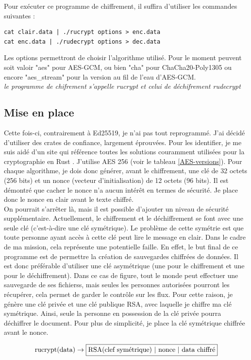 \documentclass[a4paper, 12pt]{article}
\begin{document}
Pour exécuter ce programme de chiffrement, il suffira d'utiliser les commandes suivantes : 
\begin{verbatim}
cat clair.data | ./rucrypt options > enc.data
cat enc.data | ./rudecrypt options > dec.data
\end{verbatim}
Les options permettront de choisir l'algorithme utilisé. Pour le moment peuvent soit valoir "aes" pour AES-GCM, ou bien "cha" pour ChaCha20-Poly1305 ou encore "aes\_stream" pour la version au fil de l'eau d'AES-GCM.\\


\noindent\emph{le programme de chifrement s'appelle rucrypt et celui de déchifrement rudecrypt}

\subsection{Mise en place}
Cette fois-ci, contrairement à Ed25519, je n'ai pas tout reprogrammé. J'ai décidé d'utiliser des crates de confiance, largement éprouvées. Pour les identifier, je me suis aidé d'un site qui référence toutes les solutions couramment utilisées pour la cryptographie en Rust \cite{bddrustcrypto}. J'utilise AES 256 (voir le tableau \ref{AES-versions}). Pour chaque algorithme, je dois donc générer, avant le chiffrement, une clé de 32 octets (256 bits) et un nonce (vecteur d'initialisation) de 12 octets (96 bits). Il est démontré que cacher le nonce n'a aucun intérêt en termes de sécurité. Je place donc le nonce en clair avant le texte chiffré. \\

On pourrait s'arrêter là, mais il est possible d'ajouter un niveau de sécurité supplémentaire. Actuellement, le chiffrement et le déchiffrement se font avec une seule clé (c'est-à-dire une clé symétrique). Le problème de cette symétrie est que toute personne ayant accès à cette clé peut lire le message en clair. Dans le cadre de ma mission, cela représente une potentielle faille. En effet, le but final de ce programme est de permettre la création de sauvegardes chiffrées de données. Il est donc préférable d'utiliser une clé asymétrique (une pour le chiffrement et une pour le déchiffrement). Dans ce cas de figure, tout le monde peut effectuer une sauvegarde de ses fichierss, mais seules les personnes autorisées pourront les récupérer, cela permet de garder le contrôle sur les flux. Pour cette raison, je génère une clé privée et une clé publique RSA, avec laquelle je chiffre ma clé symétrique. Ainsi, seule la personne en possession de la clé privée pourra déchiffrer le document. Pour plus de simplicité, je place la clé symétrique chiffrée avant le nonce.


$$
\text{rucrypt(data)} \rightarrow \fbox{RSA(clef symétrique) | nonce | data chiffré}
$$


\printbibliography
\end{document}
